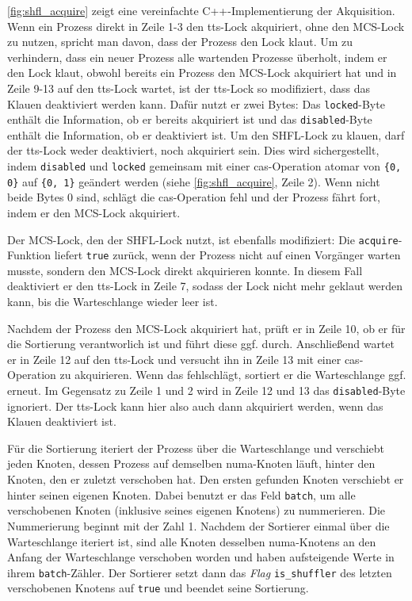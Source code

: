 \autoref{fig:shfl_acquire} zeigt eine vereinfachte C++-Implementierung der Akquisition.
Wenn ein Prozess direkt in Zeile 1-3 den \gls{tts}-Lock akquiriert,
ohne den MCS-Lock zu nutzen,
spricht man davon,
dass der Prozess den Lock klaut.
Um zu verhindern,
dass ein neuer Prozess alle wartenden Prozesse überholt,
indem er den Lock klaut,
obwohl bereits ein Prozess den MCS-Lock akquiriert hat
und in Zeile 9-13 auf den \gls{tts}-Lock wartet,
ist der \gls{tts}-Lock so modifiziert,
dass das Klauen deaktiviert werden kann.
Dafür nutzt er zwei Bytes:
Das \texttt{locked}-Byte enthält die Information,
ob er bereits akquiriert ist
und das \texttt{disabled}-Byte enthält die Information,
ob er deaktiviert ist.
Um den SHFL-Lock zu klauen,
darf der \gls{tts}-Lock weder deaktiviert,
noch akquiriert sein.
Dies wird sichergestellt,
indem \texttt{disabled} und \texttt{locked} gemeinsam
mit einer \gls{cas}-Operation atomar
von \texttt{\{0, 0\}} auf \texttt{\{0, 1\}} geändert werden
(siehe \autoref{fig:shfl_acquire}, Zeile 2).
Wenn nicht beide Bytes 0 sind,
schlägt die \gls{cas}-Operation fehl
und der Prozess fährt fort,
indem er den MCS-Lock akquiriert.

Der MCS-Lock,
den der SHFL-Lock nutzt,
ist ebenfalls modifiziert:
Die \texttt{acquire}-Funktion liefert \texttt{true} zurück,
wenn der Prozess nicht auf einen Vorgänger warten musste,
sondern den MCS-Lock direkt akquirieren konnte.
In diesem Fall deaktiviert er den \gls{tts}-Lock in Zeile 7,
sodass der Lock nicht mehr geklaut werden kann,
bis die Warteschlange wieder leer ist.

Nachdem der Prozess den MCS-Lock akquiriert hat,
prüft er in Zeile 10,
ob er für die Sortierung verantworlich ist
und führt diese ggf. durch.
Anschließend wartet er in Zeile 12 auf den \gls{tts}-Lock
und versucht ihn in Zeile 13 mit einer \gls{cas}-Operation zu akquirieren.
Wenn das fehlschlägt,
sortiert er die Warteschlange ggf. erneut.
Im Gegensatz zu Zeile 1 und 2
wird in Zeile 12 und 13 das \texttt{disabled}-Byte ignoriert.
Der \gls{tts}-Lock kann hier also auch dann akquiriert werden,
wenn das Klauen deaktiviert ist.

Für die Sortierung iteriert der Prozess über die Warteschlange
und verschiebt jeden Knoten,
dessen Prozess auf demselben \gls{numa}-Knoten läuft,
hinter den Knoten,
den er zuletzt verschoben hat.
Den ersten gefunden Knoten verschiebt er hinter seinen eigenen Knoten.
Dabei benutzt er das Feld \texttt{batch},
um alle verschobenen Knoten (inklusive seines eigenen Knotens) zu nummerieren.
Die Nummerierung beginnt mit der Zahl 1.
Nachdem der Sortierer einmal über die Warteschlange iteriert ist,
sind alle Knoten desselben \gls{numa}-Knotens an den Anfang der Warteschlange verschoben worden
und haben aufsteigende Werte in ihrem \texttt{batch}-Zähler.
Der Sortierer setzt dann das \textit{Flag} \texttt{is\_shuffler}
des letzten verschobenen Knotens
auf \texttt{true}
und beendet seine Sortierung.

